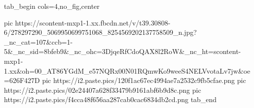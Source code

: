  
 
 
 
 

\ifcmt
  tab_begin cols=4,no_fig,center

     pic https://scontent-mxp1-1.xx.fbcdn.net/v/t39.30808-6/278297290_5069950699751068_8254569202137758509_n.jpg?_nc_cat=107&ccb=1-5&_nc_sid=8bfeb9&_nc_ohc=3DjqeRfCdoQAX8l2RoW&_nc_ht=scontent-mxp1-1.xx&oh=00_AT86YGdM_e57NQRx00N01RQmwKo9weeS4NELVvotaLv7jw&oe=626F427D
     pic https://i2.paste.pics/120f1ac67ec4994ae7a2532c9fb5cfae.png
     pic https://i2.paste.pics/02e24407a628f33479b9161abf6b9d8c.png
     pic https://i2.paste.pics/f4cca48f656aa287cab0cac6834db2cd.png
  tab_end
\fi
